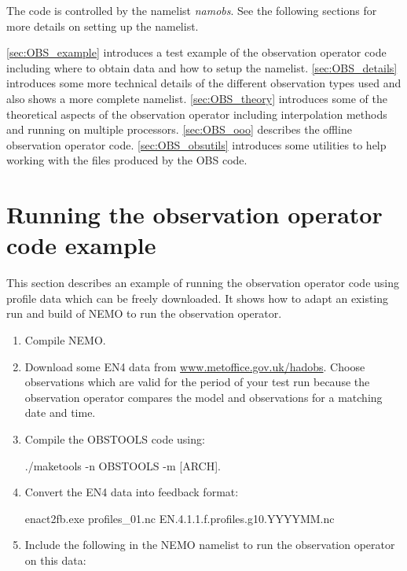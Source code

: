 \documentclass[../tex_main/NEMO_manual]{subfiles}
\begin{document}
The code is controlled by the namelist \textit{namobs}. See the following sections for more
details on setting up the namelist.

\autoref{sec:OBS_example} introduces a test example of the observation operator code including
where to obtain data and how to setup the namelist. \autoref{sec:OBS_details} introduces some
more technical details of the different observation types used and also shows a more complete
namelist. \autoref{sec:OBS_theory} introduces some of the theoretical aspects of the observation
operator including interpolation methods and running on multiple processors.
\autoref{sec:OBS_ooo} describes the offline observation operator code.
\autoref{sec:OBS_obsutils} introduces some utilities to help working with the files
produced by the OBS code.

\section{Running the observation operator code example}
\label{sec:OBS_example}

This section describes an example of running the observation operator code using
profile data which can be freely downloaded. It shows how to adapt an
existing run and build of NEMO to run the observation operator.

\begin{enumerate}
\item Compile NEMO.

\item Download some EN4 data from 
\href{http://www.metoffice.gov.uk/hadobs}{www.metoffice.gov.uk/hadobs}. Choose observations which are
valid for the period of your test run because the observation operator compares
the model and observations for a matching date and time. 

\item Compile the OBSTOOLS code using: 
\begin{cmds}
./maketools -n OBSTOOLS -m [ARCH].
\end{cmds}

\item Convert the EN4 data into feedback format: 
\begin{cmds}
enact2fb.exe profiles_01.nc EN.4.1.1.f.profiles.g10.YYYYMM.nc
\end{cmds}

\item Include the following in the NEMO namelist to run the observation
operator on this data:
\end{enumerate}
\end{document}
